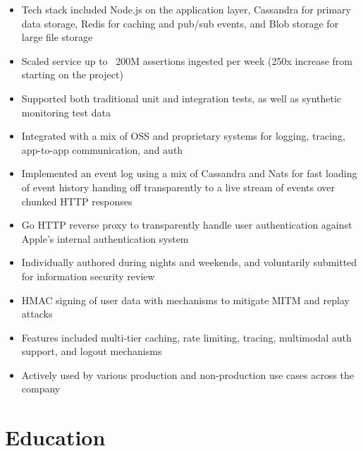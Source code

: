 \documentclass[11pt,letterpaper,sans]{moderncv}        %
\begin{document}
\vspace*{-4pt}
\begin{itemize}
\item Tech stack included Node.js on the application layer, Cassandra for primary data storage, Redis for caching and pub/sub events, and Blob storage for large file storage
\item Scaled service up to ~200M assertions ingested per week (250x increase from starting on the project)
\item Supported both traditional unit and integration tests, as well as synthetic monitoring test data
\item Integrated with a mix of OSS and proprietary systems for logging, tracing, app-to-app communication, and auth
\item Implemented an event log using a mix of Cassandra and Nats for fast loading of event history handing off transparently to a live stream of events over chunked HTTP responses
\end{itemize}
\vspace*{4pt}

\vspace*{-4pt}
\begin{itemize}
\item Go HTTP reverse proxy to transparently handle user authentication against Apple's internal authentication system
\item Individually authored during nights and weekends, and voluntarily submitted for information security review
\item HMAC signing of user data with mechanisms to mitigate MITM and replay attacks
\item Features included multi-tier caching, rate limiting, tracing, multimodal auth support, and logout mechanisms
\item Actively used by various production and non-production use cases across the company
\end{itemize}
\vspace*{4pt}

\section{Education}
\end{document}
